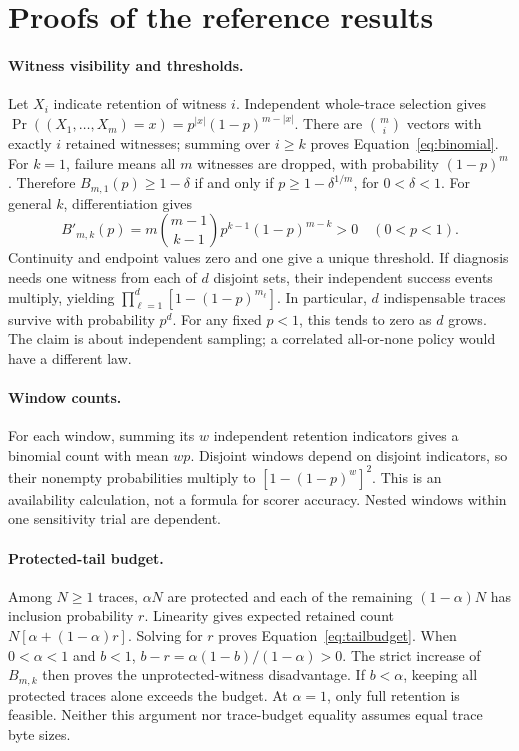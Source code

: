 \section{Proofs of the reference results}\label{app:formal}
\paragraph{Witness visibility and thresholds.}
Let $X_i$ indicate retention of witness $i$. Independent whole-trace selection gives
$\Pr((X_1,\ldots,X_m)=x)=p^{|x|}(1-p)^{m-|x|}$.
There are $\binom mi$ vectors with exactly $i$ retained witnesses; summing over $i\ge k$ proves Equation~\eqref{eq:binomial}. For $k=1$, failure means all $m$ witnesses are dropped, with probability $(1-p)^m$. Therefore
$B_{m,1}(p)\ge1-\delta$ if and only if $p\ge1-\delta^{1/m}$, for $0<\delta<1$. For general $k$, differentiation gives
\[
 B'_{m,k}(p)=m\binom{m-1}{k-1}p^{k-1}(1-p)^{m-k}>0
 \quad(0<p<1).
\]
Continuity and endpoint values zero and one give a unique threshold. If diagnosis needs one witness from each of $d$ disjoint sets, their independent success events multiply, yielding $\prod_{\ell=1}^{d}[1-(1-p)^{m_\ell}]$. In particular, $d$ indispensable traces survive with probability $p^d$. For any fixed $p<1$, this tends to zero as $d$ grows. The claim is about independent sampling; a correlated all-or-none policy would have a different law.

\paragraph{Window counts.}
For each window, summing its $w$ independent retention indicators gives a binomial count with mean $wp$. Disjoint windows depend on disjoint indicators, so their nonempty probabilities multiply to $[1-(1-p)^w]^2$. This is an availability calculation, not a formula for scorer accuracy. Nested windows within one sensitivity trial are dependent.

\paragraph{Protected-tail budget.}
Among $N\ge1$ traces, $\alpha N$ are protected and each of the remaining $(1-\alpha)N$ has inclusion probability $r$. Linearity gives expected retained count $N[\alpha+(1-\alpha)r]$. Solving for $r$ proves Equation~\eqref{eq:tailbudget}. When $0<\alpha<1$ and $b<1$, $b-r=\alpha(1-b)/(1-\alpha)>0$. The strict increase of $B_{m,k}$ then proves the unprotected-witness disadvantage. If $b<\alpha$, keeping all protected traces alone exceeds the budget. At $\alpha=1$, only full retention is feasible. Neither this argument nor trace-budget equality assumes equal trace byte sizes.

